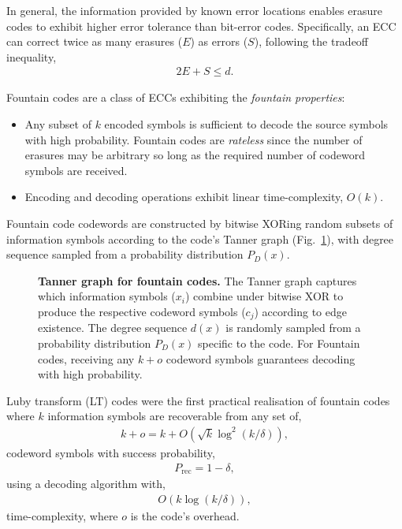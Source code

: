 In general, the information provided by known error locations enables erasure codes to exhibit higher error tolerance than bit-error codes. Specifically, an ECC can correct twice as many erasures ($E$) as errors ($S$), following the tradeoff inequality,
\begin{align}
	2E+S \leq d.
\end{align}

Fountain codes \cite{Fountain, RepFountainCodes, MackayFountain} are a class of ECCs exhibiting the \emph{fountain properties}:
\begin{itemize}
	\item Any subset of $k$ encoded symbols is sufficient to decode the source symbols with high probability. Fountain codes are \emph{rateless} since the number of erasures may be arbitrary so long as the required number of codeword symbols are received.
	\item Encoding and decoding operations exhibit linear time-complexity, $O(k)$.
\end{itemize}

Fountain code codewords are constructed by bitwise XORing random subsets of information symbols according to the code's Tanner graph (Fig.~\ref{fig:tanner_graph}), with degree sequence sampled from a probability distribution $P_D(x)$.

\begin{figure}[!htb]
	
	\caption{\textbf{Tanner graph for fountain codes.} The Tanner graph captures which information symbols ($x_i$) combine under bitwise XOR to produce the respective codeword symbols ($c_j$) according to edge existence. The degree sequence $d(x)$ is randomly sampled from a probability distribution $P_D(x)$ specific to the code. For Fountain codes, receiving any $k+o$ codeword symbols guarantees decoding with high probability.}\label{fig:tanner_graph}
\end{figure}

Luby transform (LT) codes \cite{LTCodes} were the first practical realisation of fountain codes where $k$ information symbols are recoverable from any set of,
\begin{align}
	k+o = k+O(\sqrt{k} \log^2(k/\delta)),
\end{align}
codeword symbols with success probability,
\begin{align}
	P_\mathrm{rec}=1-\delta,
\end{align}
using a decoding algorithm with,
\begin{align}
	O(k \log(k/\delta)),
\end{align}
time-complexity, where $o$ is the code's overhead.

